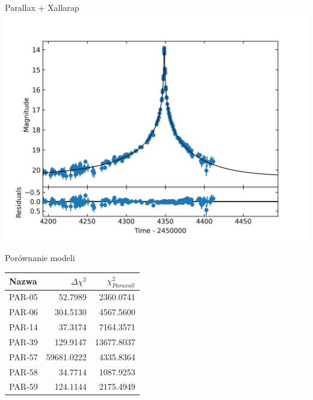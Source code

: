 \documentclass{beamer}
\begin{document}
\begin{frame}
\begin{columns}
\begin{column}{0.45\linewidth}
        \end{column}
    \end{columns}
    Parallax + Xallarap\\
    \includegraphics[width = 0.45\linewidth]{../sim30/paraxall/png/PAR-57-noaver.dat+.png}
\end{frame}

\begin{frame}{Porównanie modeli}
    \begin{table}[h]
        \centering
        \begin{tabularx}{\linewidth}{X r r}
            \toprule
            Nazwa  & $\Delta\chi^2$ & $\chi^2 _{Paraxall}$ \\
            \midrule
            PAR-05 & 52.7989        & 2360.0741            \\
            PAR-06 & 304.5130       & 4567.5600            \\
            PAR-14 & 37.3174        & 7164.3571            \\
            PAR-39 & 129.9147       & 13677.8037           \\
            PAR-57 & 59681.0222     & 4335.8364            \\
            PAR-58 & 34.7714        & 1087.9253            \\
            PAR-59 & 124.1144       & 2175.4949            \\
            \bottomrule
        \end{tabularx}
    \end{table}

\end{frame}
\end{document}
